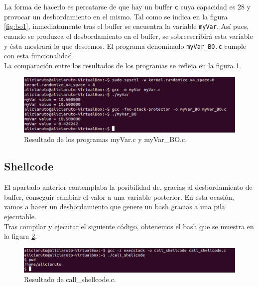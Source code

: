 \documentclass[a4,12pt,onecolum]{article}
\begin{document}
La forma de hacerlo es percatarse de que hay un buffer \texttt{c} cuya capacidad es 28 y provocar un desbordamiento en el mismo. Tal como se indica en la figura \ref{fig:bo1}, inmediatamente tras el buffer se encuentra la variable \texttt{myVar}. Así pues, cuando se produzca el desbordamiento en el buffer, se sobreescribirá esta variable y ésta mostrará lo que deseemos. El programa denominado \texttt{myVar\_BO.c} cumple con esta funcionalidad. \\

La comparación entre los resultados de los programas se refleja en la figura \ref{fig:bo2}. \\



\begin{figure}[htbp]
\centering
\includegraphics[width=1.0\textwidth]{./images/BOmyvar.png}
\caption{Resultado de los programas myVar.c y myVar\_BO.c.}
\label{fig:bo2}
\end{figure}

\subsection{Shellcode}

El apartado anterior contemplaba la posibilidad de, gracias al desbordamiento de buffer, conseguir cambiar el valor a una variable posterior. En esta ocasión, vamos a hacer un desbordamiento que genere un bash gracias a una pila ejecutable. \\

Tras compilar y ejecutar el siguiente código, obtenemos el bash que se muestra en la figura \ref{fig:bo3}.\\



\begin{figure}[htbp]
\centering
\includegraphics[width=1.0\textwidth]{./images/BOshellcode.png}
\caption{Resultado de call\_shellcode.c.}
\label{fig:bo3}
\end{figure}
\end{document}
